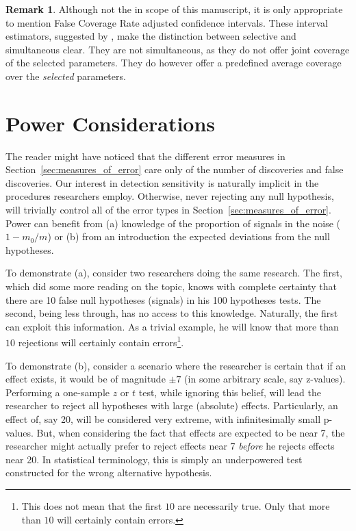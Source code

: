 \documentclass[review,12pt]{article}
\theoremstyle{definition}
\theoremstyle{definition}
\newtheorem{remark}{Remark}[section]
\begin{document}
\begin{remark}
Although not the in scope of this manuscript, it is only appropriate to mention False Coverage Rate adjusted confidence intervals. These interval estimators, suggested by \citet{benjamini_false_2005}, make the distinction between selective and simultaneous clear. They are not simultaneous, as they do not offer joint coverage of the selected parameters. They do however offer a predefined average coverage over the \emph{selected} parameters.
\end{remark}










\section{\label{sec:power}Power Considerations}

The reader might have noticed that the different error measures in Section~\ref{sec:measures_of_error} care only of the number of discoveries and false discoveries. Our interest in detection sensitivity is naturally implicit in the procedures researchers employ. Otherwise, never rejecting any null hypothesis, will trivially control all of the error types in Section~\ref{sec:measures_of_error}. 
Power can benefit from (a) knowledge of the proportion of signals in the noise ($ 1 - m_0 / m $) or (b) from an introduction the expected deviations from the null hypotheses. 

To demonstrate (a), consider two researchers doing the same research. The first, which did some more reading on the topic, knows with complete certainty that there are 10 false null hypotheses (signals) in his 100 hypotheses tests. The second, being less through, has no access to this knowledge. 
Naturally, the first can exploit this information. As a trivial example, he will know that  more than $10$ rejections will certainly contain errors\footnote{ This does not mean that the first $10$ are necessarily true. Only that more than $10$ will certainly contain errors.}. 

To demonstrate (b), consider a scenario where the researcher is certain that if an effect exists, it would be of magnitude $\pm 7$ (in some arbitrary scale, say z-values). Performing a one-sample $z$ or $t$ test, while ignoring this belief, will lead the researcher to reject all hypotheses with large (absolute) effects. Particularly, an effect of, say 20,  will be considered very extreme, with infinitesimally small p-values. But, when considering the fact that effects are expected to be near 7, the researcher might actually prefer to reject effects near 7 \emph{before} he rejects effects near 20. In  statistical terminology, this is simply an underpowered test constructed for the wrong alternative hypothesis. 
\end{document}
